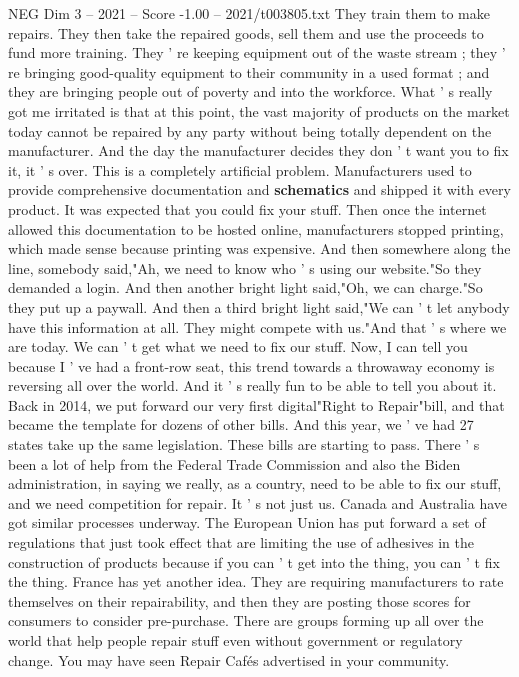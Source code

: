 \begin{textsample}{NEG Dim 3 – 2021 – Score -1.00 – 2021/t003805.txt}
They train them to make repairs.
They then take the repaired goods, sell them and use the proceeds to fund more training.
They ' re keeping equipment out of the waste stream ; they ' re bringing good-quality equipment to their community in a used format ; and they are bringing people out of poverty and into the workforce.
What ' s really got me irritated is that at this point, the vast majority of products on the market today cannot be repaired by any party without being totally dependent on the manufacturer.
And the day the manufacturer decides they don ' t want you to fix it, it ' s over.
This is a completely artificial problem.
Manufacturers used to provide comprehensive documentation and \textbf{schematics} and shipped it with every product.
It was expected that you could fix your stuff.
Then once the internet allowed this documentation to be hosted online, manufacturers stopped printing, which made sense because printing was expensive.
And then somewhere along the line, somebody said,"Ah, we need to know who ' s using our website."So they demanded a login.
And then another bright light said,"Oh, we can charge."So they put up a paywall.
And then a third bright light said,"We can ' t let anybody have this information at all.
They might compete with us."And that ' s where we are today.
We can ' t get what we need to fix our stuff.
Now, I can tell you because I ' ve had a front-row seat, this trend towards a throwaway economy is reversing all over the world.
And it ' s really fun to be able to tell you about it.
Back in 2014, we put forward our very first digital"Right to Repair"bill, and that became the template for dozens of other bills.
And this year, we ' ve had 27 states take up the same legislation.
These bills are starting to pass.
There ' s been a lot of help from the Federal Trade Commission and also the Biden administration, in saying we really, as a country, need to be able to fix our stuff, and we need competition for repair.
It ' s not just us.
Canada and Australia have got similar processes underway.
The European Union has put forward a set of regulations that just took effect that are limiting the use of adhesives in the construction of products because if you can ' t get into the thing, you can ' t fix the thing.
France has yet another idea.
They are requiring manufacturers to rate themselves on their repairability, and then they are posting those scores for consumers to consider pre-purchase.
There are groups forming up all over the world that help people repair stuff even without government or regulatory change.
You may have seen Repair Cafés advertised in your community.

\end{textsample}
